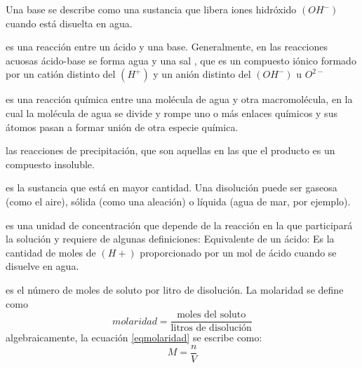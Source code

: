 \begin{definition}
	Una base se describe como una sustancia que libera iones hidróxido $(OH^{-})$
	cuando está disuelta en agua.
\end{definition}

\begin{definition}[Neutralización]
	es una reacción entre un ácido y una base. Generalmente, en las reacciones acuosas ácido-base se forma agua y una sal , que es un compuesto
	iónico formado por un catión distinto del $(H^{+})$ y un anión distinto del $(OH^{-})$ u $O^{2-}$
\end{definition}

\begin{definition}[Hidrólisis]
	es una reacción química entre una molécula de agua y otra macromolécula, en la cual la molécula de agua se divide y rompe uno o más enlaces químicos y sus átomos pasan a formar unión de otra especie química.
\end{definition}

\begin{definition}[Precipitación]
	las reacciones de precipitación, que son aquellas en las que el producto es un compuesto insoluble.
\end{definition}

\begin{definition}[Solvente]
	es la sustancia que está en mayor
	cantidad. Una disolución puede ser gaseosa (como el aire), sólida (como una aleación) o
	líquida (agua de mar, por ejemplo).
\end{definition}


\begin{definition}[Normalidad]
	es una unidad de concentración que depende de la reacción en la que participará la solución y requiere de algunas definiciones: Equivalente de un ácido: Es la cantidad de moles de $(H{+})$ proporcionado por un mol de ácido cuando se disuelve en agua.
\end{definition}

\begin{definition}[Molaridad]
	es el número de moles de soluto por litro de
	disolución. La molaridad se define como
	\begin{equation}
		\label{eqmolaridad}
		molaridad = \frac{\text{moles del soluto}}{\text{litros de disolución}}
	\end{equation}
	algebraicamente, la ecuación \eqref{eqmolaridad} se escribe como:
	\begin{equation}
		M=\frac{n}{V}
	\end{equation}
\end{definition}

